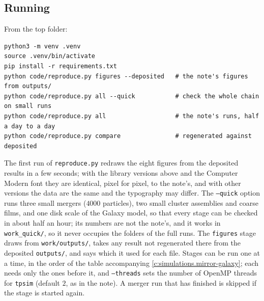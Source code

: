 \documentclass[11pt]{article}
\theoremstyle{definition}
\theoremstyle{plain}
\providecommand{\file}{}\renewcommand{\file}[1]{\texttt{#1}}
\begin{document}
\subsection*{Running}
\label{c:note.simulations.setting-running}
From the top folder:
{ \begin{verbatim}
python3 -m venv .venv
source .venv/bin/activate
pip install -r requirements.txt
python code/reproduce.py figures --deposited   # the note's figures from outputs/
python code/reproduce.py all --quick           # check the whole chain on small runs
python code/reproduce.py all                   # the note's runs, half a day to a day
python code/reproduce.py compare               # regenerated against deposited
\end{verbatim}}
The first run of \file{reproduce.py} redraws the eight figures from the deposited results in a few seconds; with the library versions above and the Computer Modern font they are identical, pixel for pixel, to the note's, and with other versions the data are the same and the typography may differ. The \texttt{--quick} option runs three small mergers ($4000$ particles), two small cluster assemblies and coarse films, and one disk scale of the Galaxy model, so that every stage can be checked in about half an hour; its numbers are not the note's, and it works in \file{work\_quick/}, so it never occupies the folders of the full runs. The \texttt{figures} stage draws from \file{work/outputs/}, takes any result not regenerated there from the deposited \file{outputs/}, and says which it used for each file. Stages can be run one at a time, in the order of the table accompanying \ref{c:simulations.mirror-galaxy}; each needs only the ones before it, and \texttt{--threads} sets the number of OpenMP threads for \file{tpsim} (default $2$, as in the note). A merger run that has finished is skipped if the stage is started again.
\end{document}
